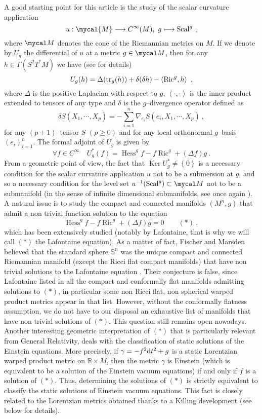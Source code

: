 \documentclass[a4paper,11pt,leqno]{amsart}
\numberwithin{equation}{section}
\theoremstyle{main}
\begin{document}
A good starting point for this article is the study of the scalar curvature application
$$ u : \mycal{M} \longrightarrow C^\infty (M) , \ g \longmapsto {\operatorname{Scal}}^g \ ,$$
where $\mycal M$ denotes the cone of the Riemannian metrics on $M$. If we denote by $U_g$ the differential of $u$ at a metric $g\in\mycal M$, then for any $h\in \Gamma(S^2 T^*M)$ we have (see \cite{B} for details)
$$U_g(h)= \Delta ({ {\rm tr}}_g (h)) + \delta (\delta h) - \left\langle {\operatorname{Ric}}^g, h\right\rangle \ ,$$
where $\Delta$ is the positive Laplacian with respect to $g$, $\left\langle \cdot,\cdot\right\rangle$ is the inner product extended to tensors of any type and $\delta$ is the $g$--divergence operator defined as
$$ \delta S (X_1,\cdots,X_p)= -\sum^{n}_{i=1}\nabla_{e_i}S(e_i,X_1, \cdots,X_p) \ ,$$
for any $(p+1)$--tensor $S$ $(p\ge 0)$ and for any local orthonormal $g$--basis $(e_i)^{n}_{i=1}$. The formal adjoint of $U_g$ is given by 
$$\forall f \in C^\infty \quad U^*_g(f)= {\operatorname{Hess}}^g f -f {\operatorname{Ric}}^g + (\Delta f) g \ .$$
From a geometric point of view, the fact that ${\operatorname{Ker}} U^*_g\neq \left\{0\right\}$ is a necessary condition for the scalar curvature application $u$ not to be a submersion at $g$, and so a necessary condition for the level set $u^{-1}({\operatorname{Scal}}^g)\subset\mycal M$ not to be a submanifold (in the sense of infinite dimensional submanifolds, see once again \cite{B}). A natural issue is to study the compact and connected manifolds $(M^n,g)$ that admit a non trivial function solution to the equation
$$ {\operatorname{Hess}}^g f -f {\operatorname{Ric}}^g + (\Delta f) g =0 \qquad (*) \ ,$$ 
which has been extensively studied (notably by Lafontaine, that is why we will call $(*)$ the Lafontaine equation). As a matter of fact, Fischer and Marsden \cite{FM} believed that the standard sphere ${{\mathbb S^{n}}}$ was the unique compact and connected Riemannian manifold (except the Ricci flat compact manifolds) that have non trivial solutions to the Lafontaine equation \cite{FM}. Their conjecture is false, since Lafontaine listed in \cite{L} all the compact and conformally flat manifolds admitting solutions  to $(*)$, in particular some non Ricci flat, non spherical warped product metrics appear in that list. However, without the conformally flatness assumption, we do not have to our disposal an exhaustive list of manifolds that have non trivial solutions of $(*)$. This question still remains open nowadays. Another interesting geometric interpretation of $(*)$ that is particularly relevant from General Relativity, deals with the classification of static solutions of the Einstein equations. More precisely, if $\gamma=-f^2{{\rm d}} t^2 +g$ is a static Lorentzian warped product metric on ${{\mathbb R}}\times M$, then the metric $\gamma$ is Einstein (which is equivalent to be a solution of the Einstein vacuum equations) if and only if $f$ is a solution of $(*)$. Thus, determining the solutions of $(*)$ is strictly equivalent to classify the static solutions of Einstein vacuum equations. This fact is closely related to the Lorentzian metrics obtained thanks to a Killing development (see below for details).\\
\end{document}

